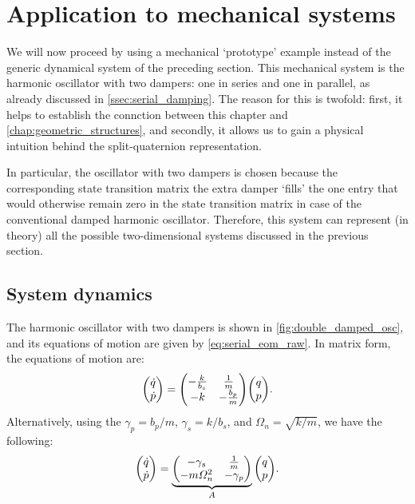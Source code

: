 \section{Application to mechanical systems}
\label{sec:mechanical}
We will now proceed by using a mechanical `prototype' example instead of the generic dynamical system of the preceding section. This mechanical system is the harmonic oscillator with two dampers: one in series and one in parallel, as already discussed in \cref{ssec:serial_damping}. The reason for this is twofold: first, it helps to establish the connction between this chapter and \cref{chap:geometric_structures}, and secondly, it allows us to gain a physical intuition behind the split-quaternion representation. 

In particular, the oscillator with two dampers is chosen because the corresponding state transition matrix the extra damper `fills' the one entry that would otherwise remain zero in the state transition matrix in case of the conventional damped harmonic oscillator. Therefore, this system can represent (in theory) all the possible two-dimensional systems discussed in the previous section.

\subsection{System dynamics}
The harmonic oscillator with two dampers is shown in \cref{fig:double_damped_osc}, and its equations of motion are given by \cref{eq:serial_eom_raw}. In matrix form, the equations of motion are:
\begin{equation*}
    \mqty(\dot{q}\\\dot{p}) = \mqty(-\tfrac{k}{b_s} & \tfrac{1}{m} \\ -k & - \tfrac{b_p}{m})\mqty(q \\ p).
\end{equation*}
Alternatively, using the \(\gamma_p = b_p/m\), \(\gamma_s = k/b_s\), and \(\Omega_n = \sqrt{k/m}\), we have the following:
\begin{equation}
    \mqty(\dot{q}\\\dot{p}) = \underbrace{\mqty(-\gamma_s & \frac{1}{m} \\ -m\Omega_n^2 & - \gamma_p)}_A \mqty(q \\ p).
    \label{eq:ddho_eom}
\end{equation}


